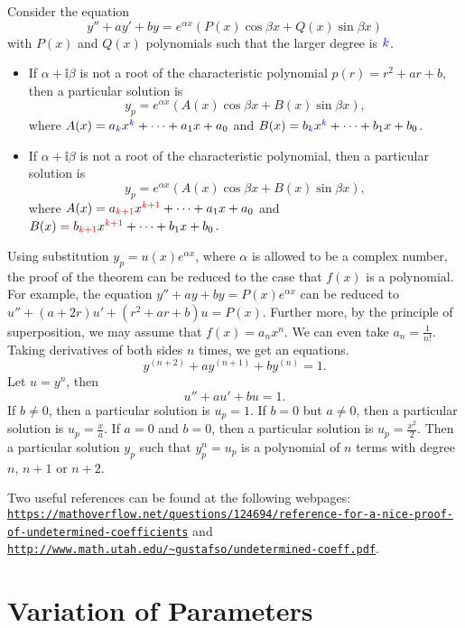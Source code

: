 \begin{theorem}
  Consider the equation 
  \[y''+ay'+by=e^{\alpha x}\left(P(x)\cos \beta x+Q(x)\sin \beta x\right)\] with $P(x)$ and $Q(x)$ polynomials such that the larger degree is ${\color{blue} k}$. 

  \begin{itemize}
    \item If $\alpha+\mathbb{i}\beta$ is not a root of the characteristic polynomial $p(r)=r^2+ar+b$, then a particular solution is \[y_p=e^{\alpha x}\left(A(x)\cos\beta x+B(x)\sin\beta x\right),\]
    where $A(x)=a_{\color{blue} k}x^{\color{blue} k}+\cdots+a_1x+a_0$ and $B(x)=b_{\color{blue} k}x^{\color{blue} k}+\cdots+b_1x+b_0$.
    \item If $\alpha+\mathbb{i}\beta$ is not a root of the characteristic polynomial, then a particular solution is \[y_p=e^{\alpha x}\left(A(x)\cos\beta x+B(x)\sin\beta x\right),\]
    where $A(x)=a_{\color{red} k+1}x^{\color{red} k+1}+\cdots+a_1x+a_0$ and $B(x)=b_{\color{red} k+1}x^{\color{red} k+1}+\cdots+b_1x+b_0$.
  \end{itemize}
\end{theorem}

Using substitution $y_p=u(x)e^{\alpha x}$, where $\alpha$ is allowed to be a complex number,  the proof of the theorem can be reduced to the case that $f(x)$ is a polynomial. For example, the equation $y''+ay+by=P(x)e^{\alpha x}$ can be reduced to $u''+(a+2r)u'+(r^2+ar+b)u=P(x)$. Further more, by the principle of superposition, we may assume that $f(x)=a_nx^n$. We can even take $a_n=\frac{1}{n!}$. Taking derivatives of both sides $n$ times, we get an equations.
\[y^{(n+2)}+ay^{(n+1)}+by^{(n)}=1.\]
Let $u=y^{n}$, then 
\[u''+au'+bu=1.\]
If $b\ne 0$, then a particular solution is $u_p=1$.
If $b=0$ but $a\ne 0$, then a particular solution is $u_p=\frac{x}{a}$.
If $a=0$ and $b=0$, then a particular solution is $u_p=\frac{x^2}{2}$.
Then a particular solution $y_p$ such that $y_p^{n}=u_p$ is a polynomial of $n$ terms with degree $n$, $n+1$ or $n+2$. 

Two useful references can be found at the following webpages:
\href{https://mathoverflow.net/questions/124694/reference-for-a-nice-proof-of-undetermined-coefficients}{\nolinkurl{https://mathoverflow.net/questions/124694/reference-for-a-nice-proof-of-undetermined-coefficients}} and \href{http://www.math.utah.edu/~gustafso/undetermined-coeff.pdf}{\nolinkurl{http://www.math.utah.edu/~gustafso/undetermined-coeff.pdf}}.

\section{Variation of Parameters}

